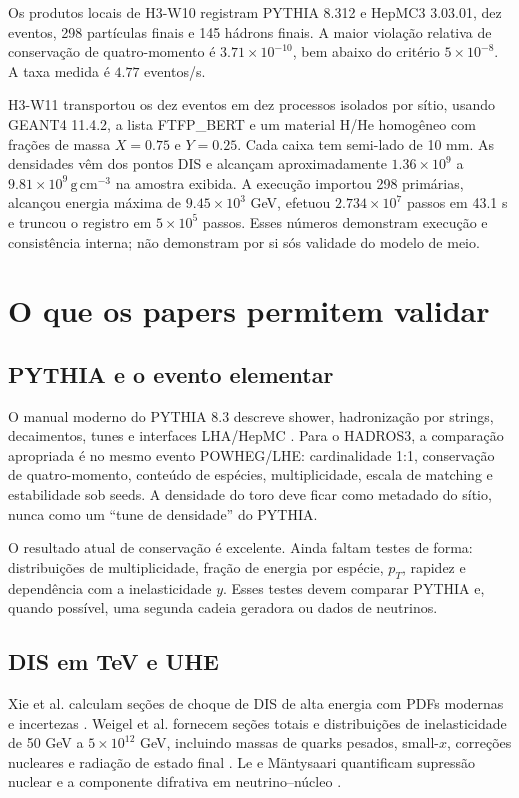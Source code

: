 \documentclass[11pt,a4paper]{article}
\begin{document}
Os produtos locais de H3-W10 registram PYTHIA 8.312 e HepMC3 3.03.01, dez
eventos, 298 partículas finais e 145 hádrons finais. A maior violação
relativa de conservação de quatro-momento é $3.71\times10^{-10}$, bem abaixo
do critério $5\times10^{-8}$. A taxa medida é $4.77$ eventos/s.

H3-W11 transportou os dez eventos em dez processos isolados por sítio,
usando GEANT4 11.4.2, a lista FTFP\_BERT e um material H/He homogêneo com
frações de massa $X=0.75$ e $Y=0.25$. Cada caixa tem semi-lado de 10 mm. As
densidades vêm dos pontos DIS e alcançam aproximadamente
$1.36\times10^9$ a $9.81\times10^9\,\mathrm{g\,cm^{-3}}$ na amostra exibida.
A execução importou 298 primárias, alcançou energia máxima de
$9.45\times10^3$ GeV, efetuou $2.734\times10^7$ passos em 43.1 s e truncou o
registro em $5\times10^5$ passos. Esses números demonstram execução e
consistência interna; não demonstram por si sós validade do modelo de meio.

\section{O que os papers permitem validar}

\subsection{PYTHIA e o evento elementar}

O manual moderno do PYTHIA 8.3 descreve shower, hadronização por strings,
decaimentos, tunes e interfaces LHA/HepMC \cite{Bierlich2022Pythia}. Para o
HADROS3, a comparação apropriada é no mesmo evento POWHEG/LHE: cardinalidade
1:1, conservação de quatro-momento, conteúdo de espécies, multiplicidade,
escala de matching e estabilidade sob seeds. A densidade do toro deve ficar
como metadado do sítio, nunca como um ``tune de densidade'' do PYTHIA.

O resultado atual de conservação é excelente. Ainda faltam testes de forma:
distribuições de multiplicidade, fração de energia por espécie, $p_T$,
rapidez e dependência com a inelasticidade $y$. Esses testes devem comparar
PYTHIA e, quando possível, uma segunda cadeia geradora ou dados de neutrinos.

\subsection{DIS em TeV e UHE}

Xie et al. calculam seções de choque de DIS de alta energia com PDFs modernas
e incertezas \cite{Xie2024}. Weigel et al. fornecem seções totais e
distribuições de inelasticidade de 50 GeV a $5\times10^{12}$ GeV, incluindo
massas de quarks pesados, small-$x$, correções nucleares e radiação de estado
final \cite{Weigel2024}. Le e Mäntysaari quantificam supressão nuclear e a
componente difrativa em neutrino--núcleo \cite{Le2024}.
\end{document}
